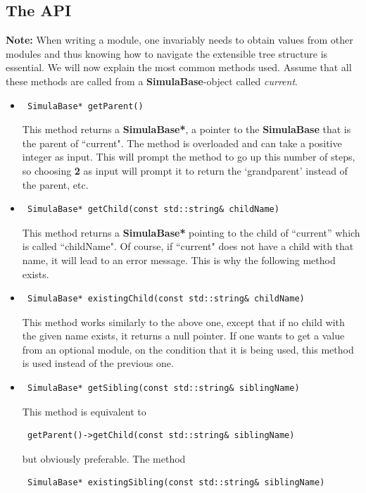 \documentclass{article}
\begin{document}
\subsection{The API}\label{API}

\noindent \textbf{Note:} When writing a module, one invariably needs to obtain values from other modules and thus knowing how to navigate the extensible tree structure is essential. We will now explain the most common methods used. Assume that all these methods are called from a \textbf{SimulaBase}-object called \textit{current}.

\begin{itemize}
\item \begin{verbatim} SimulaBase* getParent() \end{verbatim}
This method returns a \textbf{SimulaBase*}, a pointer to the \textbf{SimulaBase} that is the parent of ``current". The method is overloaded and can take a positive integer as input. This will prompt the method to go up this number of steps, so choosing \textbf{2} as input will prompt it to return the `grandparent' instead of the parent, etc.
\item \begin{verbatim} SimulaBase* getChild(const std::string& childName) \end{verbatim}
This method returns a \textbf{SimulaBase*} pointing to the child of ``current'' which is called ``childName". Of course, if ``current" does not have a child with that name, it will lead to an error message. This is why the following method exists.
\item \begin{verbatim} SimulaBase* existingChild(const std::string& childName) \end{verbatim}
This method works similarly to the above one, except that if no child with the given name exists, it returns a null pointer. If one wants to get a value from an optional module, on the condition that it is being used, this method is used instead of the previous one.
\item \begin{verbatim} SimulaBase* getSibling(const std::string& siblingName) \end{verbatim}
This method is equivalent to 
\begin{verbatim} getParent()->getChild(const std::string& siblingName) \end{verbatim}
but obviously preferable. The method
\begin{verbatim} SimulaBase* existingSibling(const std::string& siblingName) \end{verbatim}

\end{itemize}
\end{document}
